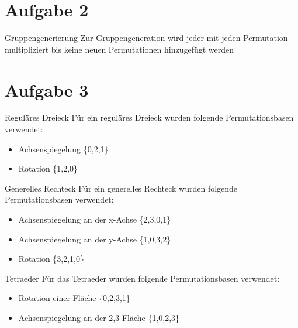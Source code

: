 \documentclass[aspectratio=169]{beamer}
\begin{document}
\section{Aufgabe 2}
	\begin{frame}{Gruppengenerierung}
		Zur Gruppengeneration wird jeder mit jeden Permutation multipliziert bis keine neuen Permutationen hinzugefügt werden
	\end{frame}

\section{Aufgabe 3}
	\begin{frame}{Reguläres Dreieck}
		Für ein reguläres Dreieck wurden folgende Permutationsbasen verwendet:
		\begin{itemize}
			\item Achsenspiegelung \newline \{0,2,1\}
			\item Rotation \newline \{1,2,0\}
		\end{itemize}
	\end{frame}
	
	\begin{frame}{Generelles Rechteck}
		Für ein generelles Rechteck wurden folgende Permutationsbasen verwendet:
		\begin{itemize}
			\item Achsenspiegelung an der x-Achse \newline \{2,3,0,1\}
			\item Achsenspiegelung an der y-Achse \newline \{1,0,3,2\}
			\item Rotation \newline \{3,2,1,0\}
		\end{itemize}
	\end{frame}
	
	\begin{frame}{Tetraeder}
		Für das Tetraeder wurden folgende Permutationsbasen verwendet:
		\begin{itemize}
			\item Rotation einer Fläche \newline \{0,2,3,1\}
			\item Achsenspiegelung an der 2,3-Fläche \newline \{1,0,2,3\}
		\end{itemize}
	\end{frame}
	
\end{document}
